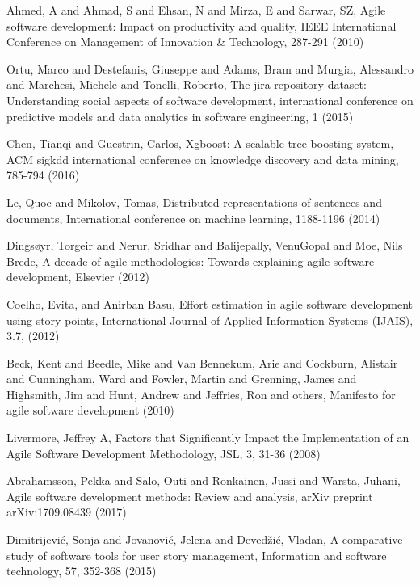 \begin{thebibliography}{}
Ahmed, A and Ahmad, S and Ehsan, N and Mirza, E and Sarwar, SZ, Agile software development: Impact on productivity and quality, IEEE International Conference on Management of Innovation \& Technology, 287-291 (2010)

Ortu, Marco and Destefanis, Giuseppe and Adams, Bram and Murgia, Alessandro and Marchesi, Michele and Tonelli, Roberto, The jira repository dataset: Understanding social aspects of software development, international conference on predictive models and data analytics in software engineering, 1 (2015)

Chen, Tianqi and Guestrin, Carlos, Xgboost: A scalable tree boosting system, ACM sigkdd international conference on knowledge discovery and data mining, 785-794 (2016)


Le, Quoc and Mikolov, Tomas, Distributed representations of sentences and documents, International conference on machine learning, 1188-1196 (2014)

Dings{\o}yr, Torgeir and Nerur, Sridhar and Balijepally, VenuGopal and Moe, Nils Brede, A decade of agile methodologies: Towards explaining agile software development, Elsevier (2012)

Coelho, Evita, and Anirban Basu, Effort estimation in agile software development using story points, International Journal of Applied Information Systems (IJAIS), 3.7, (2012)


Beck, Kent and Beedle, Mike and Van Bennekum, Arie and Cockburn, Alistair and Cunningham, Ward and Fowler, Martin and Grenning, James and Highsmith, Jim and Hunt, Andrew and Jeffries, Ron and others, Manifesto for agile software development (2010)

Livermore, Jeffrey A, Factors that Significantly Impact the Implementation of an Agile Software Development Methodology, JSL, 3, 31-36 (2008)


Abrahamsson, Pekka and Salo, Outi and Ronkainen, Jussi and Warsta, Juhani, Agile software development methods: Review and analysis, arXiv preprint arXiv:1709.08439 (2017)


Dimitrijevi{\'c}, Sonja and Jovanovi{\'c}, Jelena and Deved{\v{z}}i{\'c}, Vladan, A comparative study of software tools for user story management, Information and software technology, 57, 352-368 (2015)


\end{thebibliography}
